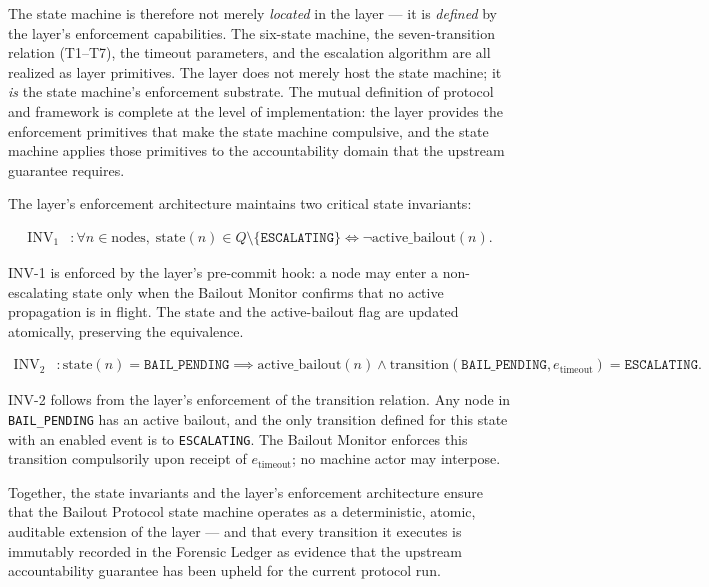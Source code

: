 The state machine is therefore not merely \emph{located} in the \fact{} layer — it is \emph{defined} by the \fact{} layer's enforcement capabilities. The six-state machine, the seven-transition relation (T1–T7), the timeout parameters, and the escalation algorithm are all realized as \fact{} layer primitives. The \fact{} layer does not merely host the state machine; it \emph{is} the state machine's enforcement substrate. The mutual definition of protocol and framework is complete at the level of implementation: the \fact{} layer provides the enforcement primitives that make the state machine compulsive, and the state machine applies those primitives to the accountability domain that the upstream guarantee requires.

The \fact{} layer's enforcement architecture maintains two critical state invariants:

\begin{align}
\mathrm{INV}_1&: \forall n\in\mathrm{nodes},\; \mathrm{state}(n)\in Q\setminus\{\texttt{ESCALATING}\}\iff\neg\mathrm{active\_bailout}(n). \tag{INV-1}
\end{align}

INV-1 is enforced by the \fact{} layer's pre-commit hook: a node may enter a non-escalating state only when the Bailout Monitor confirms that no active propagation is in flight. The state and the active-bailout flag are updated atomically, preserving the equivalence.

\begin{align}
\mathrm{INV}_2&: \mathrm{state}(n)=\texttt{BAIL\_PENDING}\implies\mathrm{active\_bailout}(n)\land\mathrm{transition}(\texttt{BAIL\_PENDING},e_{\mathrm{timeout}})=\texttt{ESCALATING}. \tag{INV-2}
\end{align}

INV-2 follows from the \fact{} layer's enforcement of the transition relation. Any node in \texttt{BAIL\_PENDING} has an active bailout, and the only transition defined for this state with an enabled event is to \texttt{ESCALATING}. The Bailout Monitor enforces this transition compulsorily upon receipt of $e_{\mathrm{timeout}}$; no machine actor may interpose.

Together, the state invariants and the \fact{} layer's enforcement architecture ensure that the Bailout Protocol state machine operates as a deterministic, atomic, auditable extension of the \fact{} layer — and that every transition it executes is immutably recorded in the Forensic Ledger as evidence that the upstream accountability guarantee has been upheld for the current protocol run.
